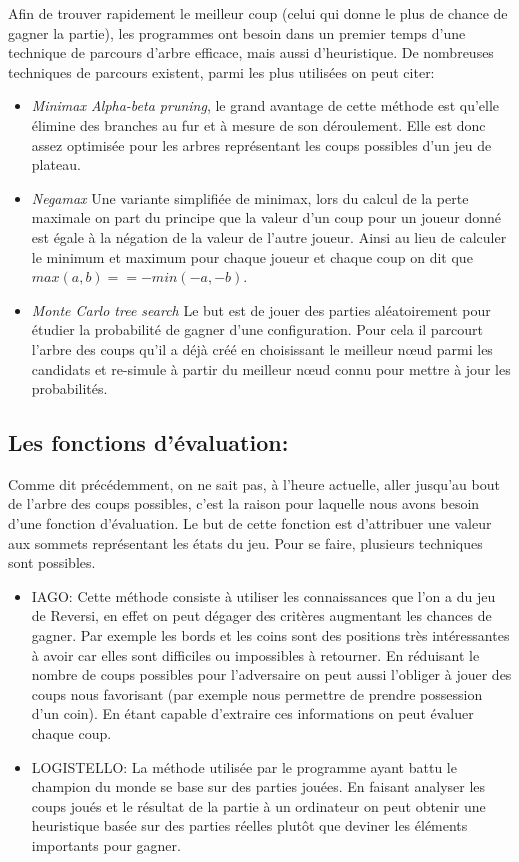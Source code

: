 \documentclass[12pt]{article}
\begin{document}
Afin de trouver rapidement le meilleur coup (celui qui donne le plus de chance de gagner la partie), les programmes ont besoin dans un premier temps d'une technique de parcours d'arbre efficace, mais aussi d'heuristique. De nombreuses techniques de parcours existent, parmi les plus utilisées on peut citer:
\begin{itemize}
\item \textit{Minimax Alpha-beta pruning}\cite{alpha-beta}, le grand avantage de cette méthode est qu'elle élimine des branches au fur et à mesure de son déroulement. Elle est donc assez optimisée pour les arbres représentant les coups possibles d'un jeu de plateau.
\item \textit{Negamax} Une variante simplifiée de minimax, lors du calcul de la perte maximale on part du principe que la valeur d'un coup pour un joueur donné est égale à la négation de la valeur de l'autre joueur. Ainsi au lieu de calculer le minimum et maximum pour chaque joueur et chaque coup on dit que \begin{math}
max(a, b) == -min(-a, -b).
\end{math}
\item \textit{Monte Carlo tree search}\cite{MonteCarlo} Le but est de jouer des parties aléatoirement pour étudier la probabilité de gagner d'une configuration. Pour cela il parcourt l'arbre des coups qu'il a déjà créé en choisissant le meilleur nœud parmi les candidats et re-simule à partir du meilleur nœud connu pour mettre à jour les probabilités. 
\end{itemize}

\subsection{Les fonctions d'évaluation:}
Comme dit précédemment, on ne sait pas, à l'heure actuelle, aller jusqu'au bout de l'arbre des coups possibles, c'est la raison pour laquelle nous avons besoin d'une fonction d'évaluation. Le but de cette fonction est d'attribuer une valeur aux sommets représentant les états du jeu. Pour se faire, plusieurs techniques sont possibles\cite{heuristique}.
\begin{itemize}
\item IAGO: Cette méthode consiste à utiliser les connaissances que l'on a du jeu de Reversi\cite{strategie}, en effet on peut dégager des critères augmentant les chances de gagner. Par exemple les bords et les coins sont des positions très intéressantes à avoir car elles sont difficiles ou impossibles à retourner. En réduisant le nombre de coups possibles pour l'adversaire on peut aussi l'obliger à jouer des coups nous favorisant (par exemple nous permettre de prendre possession d'un coin). En étant capable d'extraire ces informations on peut évaluer chaque coup.
\item LOGISTELLO: La méthode utilisée par le programme ayant battu le champion du monde se base sur des parties jouées. En faisant analyser les coups joués et le résultat de la partie à un ordinateur on peut obtenir une heuristique basée sur des parties réelles plutôt que deviner les éléments importants pour gagner.
\end{itemize}
\end{document}
